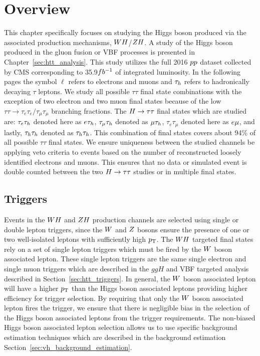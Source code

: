 \section{Overview}
This chapter specifically focuses on studying the Higgs boson produced via the associated
production mechanisms, $WH$/$ZH$. A study of the Higgs boson produced in the gluon fusion or VBF processes
is presented in Chapter~\ref{sec:htt_analysis}. This study utilizes the
full 2016 $pp$ dataset collected by CMS corresponding to 35.9$fb^{-1}$ of integrated luminosity.
In the following pages the symbol $\ell$ refers to electrons and muons and $\tau_{h}$ refers to hadronically
decaying $\tau$ leptons. We study all possible $\tau\tau$ final state combinations with the
exception of two electron and two muon final states because of the low 
$\tau\tau \to \tau_{e}\tau_{e}/\tau_{\mu}\tau_{\mu}$
branching fractions. The $H\to\tau\tau$ final states which are
studied are: $\tau_{e}\tau_{h}$ denoted here as $e\tau_{h}$, $\tau_{\mu}\tau_{h}$ denoted as $\mu\tau_{h}$,
$\tau_{e}\tau_{\mu}$ denoted here as $e\mu$, and lastly, $\tau_{h}\tau_{h}$ denoted as $\tau_{h}\tau_{h}$.
This combination of final states covers about 94\% of all possible $\tau\tau$ final states.
We ensure uniqueness between the studied channels be applying veto criteria to events based
on the number of reconstructed loosely identified electrons and muons. This ensures that 
no data or simulated event is double counted between the two $H\to\tau\tau$ studies or in 
multiple final states.



\subsection{Triggers}
Events in the $WH$ and $ZH$ production channels are selected using single or 
double lepton triggers, since the $W$ and $Z$ bosons ensure the presence of one 
or two well-isolated leptons with sufficiently high $p_\mathrm{T}$. 
The $WH$ targeted final states rely on a set of single lepton triggers
which must be fired by the $W$ boson associated lepton. These single
lepton triggers are the same single electron and single muon triggers which are 
described in the $ggH$ and VBF targeted analysis described in 
Section~\ref{sec:htt_triggers}. In general, the $W$ boson associated lepton
will have a higher $p_\mathrm{T}$ than the Higgs boson associated leptons providing
higher efficiency for trigger selection. By requiring that only the $W$
boson associated lepton fires the trigger, we ensure that there is negligible
bias in the selection of the Higgs boson associated leptons from the trigger
requirements. The non-biased Higgs boson associated lepton selection 
allows us to use specific background estimation techniques which are described
in the background estimation Section~\ref{sec:vh_background_estimation}.


